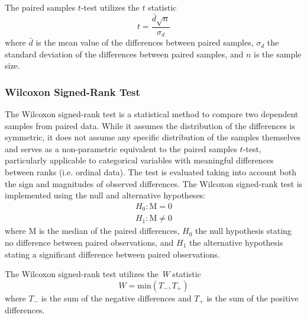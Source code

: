 The paired samples $t$-test utilizes the $t$ statistic
\begin{equation}
	t = \frac{\bar{d}\sqrt{n}}{\sigma_d}
\end{equation}
where $\bar{d}$ is the mean value of the differences between paired samples, $\sigma_d$ the standard deviation of the differences between paired samples, and $n$ is the sample size.

\subsubsection{Wilcoxon Signed-Rank Test}
\hfill \break
The Wilcoxon signed-rank test is a statistical method to compare two dependent samples from paired data. While it assumes the distribution of the differences is symmetric, it does not assume any specific distribution of the samples themselves and serves as a non-parametric equivalent to the paired samples $t$-test, particularly applicable to categorical variables with meaningful differences between ranks (i.e. ordinal data). The test is evaluated taking into account both the sign and magnitudes of observed differences. The Wilcoxon signed-rank test is implemented using the null and alternative hypotheses:
\begin{equation}
\begin{array}{c}
	H_0: \mathrm{M} = 0   \\
	H_1: \mathrm{M} \neq 0
\end{array}
\end{equation}
where M is the median of the paired differences, $H_0$ the null hypothesis stating no difference between paired observations, and $H_1$ the alternative hypothesis stating a significant difference between paired observations.

The Wilcoxon signed-rank test utilizes the \textit{W} statistic
\begin{equation}
	 W = \mathrm{min}(T_-, T_+)
\end{equation}
where $T_-$ is the sum of the negative differences and $T_+$ is the sum of the positive differences.


